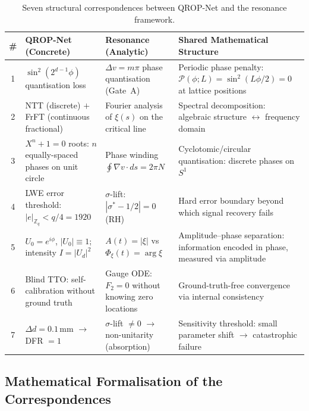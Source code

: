 \documentclass[11pt, a4paper]{article}
\theoremstyle{definition}
\theoremstyle{plain}
\newcommand{\Zq}{\mathbb{Z}_q}
\newcommand{\xif}{\xi}                      %
\newcommand{\Phiz}{\Phi_\xi}               %
\newcommand{\Ampl}{A}                       %
\begin{document}
\begin{table}[ht]
\centering
\caption{Seven structural correspondences between QROP-Net and the
resonance framework.}
\label{tab:correspondence}
\small
\begin{tabular}{@{} c p{3.5cm} p{3.5cm} p{4.5cm} @{}}
\toprule
\textbf{\#} & \textbf{QROP-Net (Concrete)} & \textbf{Resonance (Analytic)}
& \textbf{Shared Mathematical Structure} \\
\midrule
1 & $\sin^2(2^{d-1}\phi)$ quantisation loss
  & $\Delta v = m\pi$ phase quantisation (Gate~A)
  & Periodic phase penalty: $\mathcal{P}(\phi;L) = \sin^2(L\phi/2) = 0$
    at lattice positions \\

2 & NTT (discrete) $+$ FrFT (continuous fractional)
  & Fourier analysis of $\xif(s)$ on the critical line
  & Spectral decomposition: algebraic structure $\leftrightarrow$
    frequency domain \\

3 & $X^n + 1 = 0$ roots: $n$ equally-spaced phases on unit circle
  & Phase winding $\oint\nabla v \cdot ds = 2\pi N$
  & Cyclotomic/circular quantisation: discrete phases on $S^1$ \\

4 & LWE error threshold: $|e|_{\Zq} < q/4 = 1920$
  & $\sigma$-lift: $|\sigma^* - 1/2| = 0$ (RH)
  & Hard error boundary beyond which signal recovery fails \\

5 & $U_0 = e^{i\phi}$, $|U_0| \equiv 1$; intensity $I = |U_d|^2$
  & $\Ampl(t) = |\xif|$ vs $\Phiz(t) = \arg\xif$
  & Amplitude--phase separation: information encoded in phase,
    measured via amplitude \\

6 & Blind TTO: self-calibration without ground truth
  & Gauge ODE: $F_2 = 0$ without knowing zero locations
  & Ground-truth-free convergence via internal consistency \\

7 & $\Delta d = 0.1\,$mm $\to$ DFR $= 1$
  & $\sigma$-lift $\neq 0$ $\to$ non-unitarity (absorption)
  & Sensitivity threshold: small parameter shift $\to$ catastrophic
    failure \\
\bottomrule
\end{tabular}
\end{table}

\subsection{Mathematical Formalisation of the Correspondences}
\end{document}

